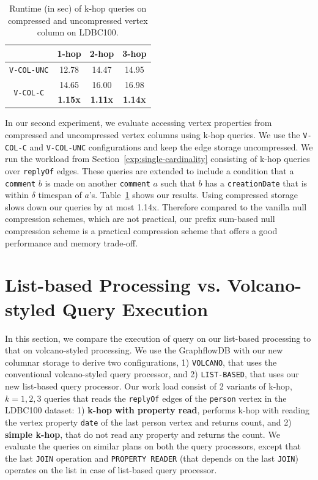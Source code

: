 \begin{table}
	\centering
	\bgroup
	\setlength{\tabcolsep}{8pt}
	\def\arraystretch{1.2}%
	\begin{tabular}{ |c|c|c|c| } 
		\hline
		& \textbf{1-hop} & \textbf{2-hop} & \textbf{3-hop} \\
		\hline \hline
		\texttt{V-COL-UNC}& 12.78 & 14.47 & 14.95\\ 
		\hline
		\multirow{2}{*}{\texttt{V-COL-C}}& 14.65 & 16.00 & 16.98 \\ 
		& \textbf{1.15x} & \textbf{1.11x} & \textbf{1.14x}\\ 
		\hline  
	\end{tabular}
	\egroup
	\captionsetup{justification=centering}
	\caption{Runtime (in sec) of k-hop queries on compressed and uncompressed vertex column on LDBC100.}
	\label{tbl:s3}
\end{table}

In our second experiment, we evaluate accessing vertex properties from compressed and uncompressed vertex columns using k-hop queries. We use the \texttt{V-COL-C} and \texttt{V-COL-UNC} configurations and keep the edge storage uncompressed. We run the workload from Section~\ref{exp:single-cardinality} consisting of k-hop queries over \texttt{replyOf} edges. These queries are extended to include a condition that a \texttt{comment} $b$ is made on another \texttt{comment} $a$ such that $b$ has a \texttt{creationDate} that is within $\delta$ timespan of $a$'s. Table~\ref{tbl:s3} shows our results. Using compressed storage slows down our queries by at most 1.14x. Therefore compared to the vanilla null compression schemes, which are not practical, our prefix sum-based null compression scheme is a practical compression scheme that offers a good performance and memory trade-off.

\section{List-based Processing vs. Volcano-styled Query Execution}
\label{exp:list-based}

In this section, we compare the execution of query on our list-based processing to that on volcano-styled processing. We use the GraphflowDB with our new columnar storage to derive two configurations, 1) \texttt{VOLCANO}, that uses the conventional volcano-styled query processor, and 2) \texttt{LIST-BASED}, that uses our new list-based query processor. Our work load consist of 2 variants of k-hop, $k=1,2,3$ queries that reads the \texttt{replyOf} edges of the \texttt{person} vertex in the LDBC100 dataset: 1) \textbf{k-hop with property read}, performs k-hop with reading the vertex property \texttt{date} of the last person vertex and returns count, and 2) \textbf{simple k-hop}, that do not read any property and returns the count. We evaluate the queries on similar plans on both the query processors, except that the last \texttt{JOIN} operation and \texttt{PROPERTY READER} (that depends on the last \texttt{JOIN}) operates on the list in case of list-based query processor.

